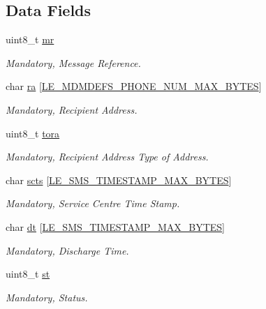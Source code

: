 \subsection*{Data Fields}
\begin{DoxyCompactItemize}
\item 
uint8\+\_\+t \hyperlink{structpa__sms___sms_status_report__t_a65f858c82eaed11ccb4eb50e9f4a50fb}{mr}
\begin{DoxyCompactList}\small\item\em Mandatory, Message Reference. \end{DoxyCompactList}\item 
char \hyperlink{structpa__sms___sms_status_report__t_af715a8d5325c7db3f3d124fc8b7f47a4}{ra} \mbox{[}\hyperlink{le__mdm_defs__interface_8h_ae6d4a4c7892f14d1e340f8df083d479f}{L\+E\+\_\+\+M\+D\+M\+D\+E\+F\+S\+\_\+\+P\+H\+O\+N\+E\+\_\+\+N\+U\+M\+\_\+\+M\+A\+X\+\_\+\+B\+Y\+T\+ES}\mbox{]}
\begin{DoxyCompactList}\small\item\em Mandatory, Recipient Address. \end{DoxyCompactList}\item 
uint8\+\_\+t \hyperlink{structpa__sms___sms_status_report__t_a9a7fe34e7727fe41d1014153a71dbec9}{tora}
\begin{DoxyCompactList}\small\item\em Mandatory, Recipient Address Type of Address. \end{DoxyCompactList}\item 
char \hyperlink{structpa__sms___sms_status_report__t_afa3a78bd652b132c06d62f16d5573b19}{scts} \mbox{[}\hyperlink{le__sms__interface_8h_a9844280f515fbc2b393844e63aa83075}{L\+E\+\_\+\+S\+M\+S\+\_\+\+T\+I\+M\+E\+S\+T\+A\+M\+P\+\_\+\+M\+A\+X\+\_\+\+B\+Y\+T\+ES}\mbox{]}
\begin{DoxyCompactList}\small\item\em Mandatory, Service Centre Time Stamp. \end{DoxyCompactList}\item 
char \hyperlink{structpa__sms___sms_status_report__t_ae13099a8e30a37a1c3cb50ac168a87ed}{dt} \mbox{[}\hyperlink{le__sms__interface_8h_a9844280f515fbc2b393844e63aa83075}{L\+E\+\_\+\+S\+M\+S\+\_\+\+T\+I\+M\+E\+S\+T\+A\+M\+P\+\_\+\+M\+A\+X\+\_\+\+B\+Y\+T\+ES}\mbox{]}
\begin{DoxyCompactList}\small\item\em Mandatory, Discharge Time. \end{DoxyCompactList}\item 
uint8\+\_\+t \hyperlink{structpa__sms___sms_status_report__t_aa553a0384b3dc94f8af1f8c00160e2d3}{st}
\begin{DoxyCompactList}\small\item\em Mandatory, Status. \end{DoxyCompactList}\end{DoxyCompactItemize}


